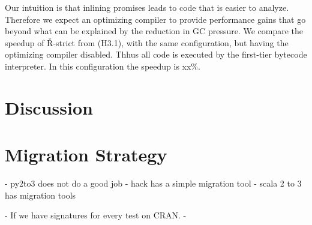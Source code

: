 \documentclass[review,nonacm,screen,acmsmall,anonymous=true]{acmart}
\begin{document}
Our intuition is that inlining promises leads to code that is easier to analyze.
Therefore we expect an optimizing compiler to provide performance gains that go
beyond what can be explained by the reduction in GC pressure. We compare the
speedup of Ř-strict from (H3.1), with the same configuration, but having the
optimizing compiler disabled. Thhus all code is executed by the first-tier
bytecode interpreter. In this configuration the speedup is xx\%.




\section{Discussion}



\section{Migration Strategy}
- py2to3 does not do a good job
- hack has a simple migration tool
- scala 2 to 3 has migration tools

- If we have signatures for every test on CRAN.
-



\end{document}

